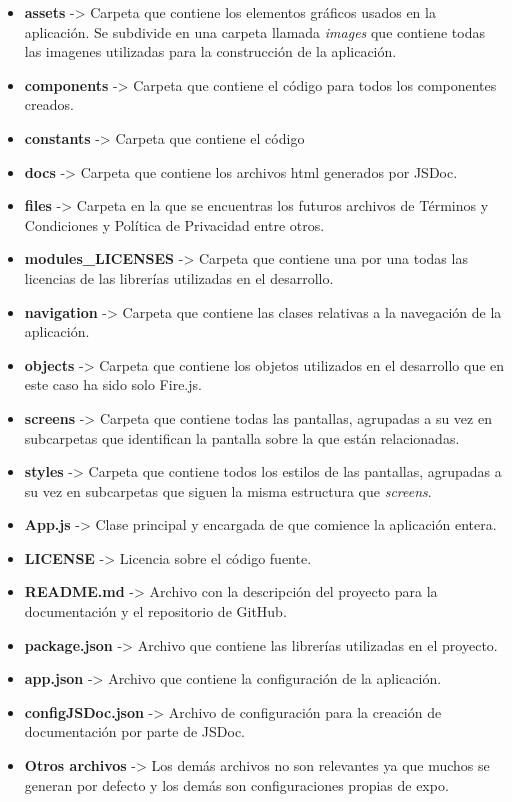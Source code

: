 \begin{itemize}
	\item \textbf{assets} -> Carpeta que contiene los elementos gráficos usados en la aplicación. Se subdivide en una carpeta llamada \textit{images} que contiene todas las imagenes utilizadas para la construcción de la aplicación.
	\item \textbf{components} -> Carpeta que contiene el código para todos los componentes creados.
	\item \textbf{constants} -> Carpeta que contiene el código
	\item \textbf{docs} -> Carpeta que contiene los archivos html generados por JSDoc.
	\item \textbf{files} -> Carpeta en la que se encuentras los futuros archivos de Términos y Condiciones y Política de Privacidad entre otros.
	\item \textbf{modules\_LICENSES} -> Carpeta que contiene una por una todas las licencias de las librerías utilizadas en el desarrollo.
	\item \textbf{navigation} -> Carpeta que contiene las clases relativas a la navegación de la aplicación.
	\item \textbf{objects} -> Carpeta que contiene los objetos utilizados en el desarrollo que en este caso ha sido solo Fire.js.
	\item \textbf{screens} -> Carpeta que contiene todas las pantallas, agrupadas a su vez en subcarpetas que identifican la pantalla sobre la que están relacionadas.
	\item \textbf{styles} -> Carpeta que contiene todos los estilos de las pantallas, agrupadas a su vez en subcarpetas que siguen la misma estructura que \textit{screens}.
	\item \textbf{App.js} -> Clase principal y encargada de que comience la aplicación entera.
	\item \textbf{LICENSE} -> Licencia sobre el código fuente.
	\item \textbf{README.md} -> Archivo con la descripción del proyecto para la documentación y el repositorio de GitHub.
	\item \textbf{package.json} -> Archivo que contiene las librerías utilizadas en el proyecto.
	\item \textbf{app.json} -> Archivo que contiene la configuración de la aplicación.
	\item \textbf{configJSDoc.json} -> Archivo de configuración para la creación de documentación por parte de JSDoc.
	\item \textbf{Otros archivos} -> Los demás archivos no son relevantes ya que muchos se generan por defecto y los demás son configuraciones propias de expo.
\end{itemize}